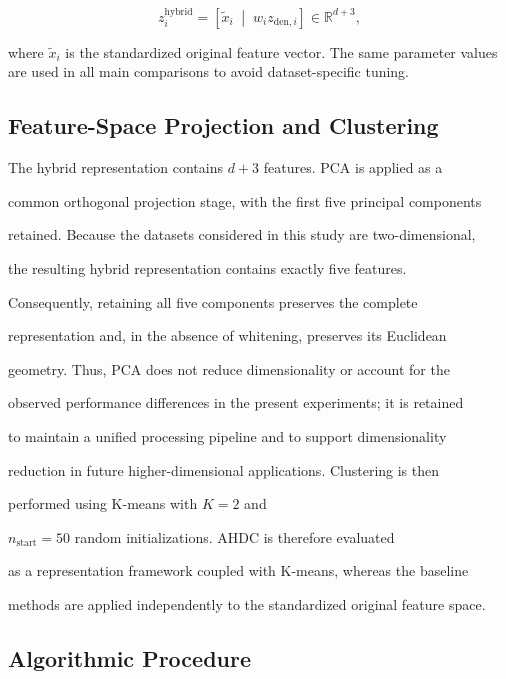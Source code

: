 \documentclass[10pt,twoside]{article}
\numberwithin{equation}{section}
\begin{document}
\begin{equation}

	z_i^{\mathrm{hybrid}}=\left[\tilde{x}_i\;\middle|\;w_i z_{\mathrm{den},i}\right]\in\mathbb{R}^{d+3},

	\label{eq:hybrid}

\end{equation}

where $\tilde{x}_i$ is the standardized original feature vector. The same parameter values are used in all main comparisons to avoid dataset-specific tuning.

\subsection{Feature-Space Projection and Clustering}



The hybrid representation contains $d+3$ features. PCA is applied as a

common orthogonal projection stage, with the first five principal components

retained. Because the datasets considered in this study are two-dimensional,

the resulting hybrid representation contains exactly five features.

Consequently, retaining all five components preserves the complete

representation and, in the absence of whitening, preserves its Euclidean

geometry. Thus, PCA does not reduce dimensionality or account for the

observed performance differences in the present experiments; it is retained

to maintain a unified processing pipeline and to support dimensionality

reduction in future higher-dimensional applications. Clustering is then

performed using K-means with $K=2$ and

$n_{\mathrm{start}}=50$ random initializations. AHDC is therefore evaluated

as a representation framework coupled with K-means, whereas the baseline

methods are applied independently to the standardized original feature space.



\subsection{Algorithmic Procedure}
\end{document}
